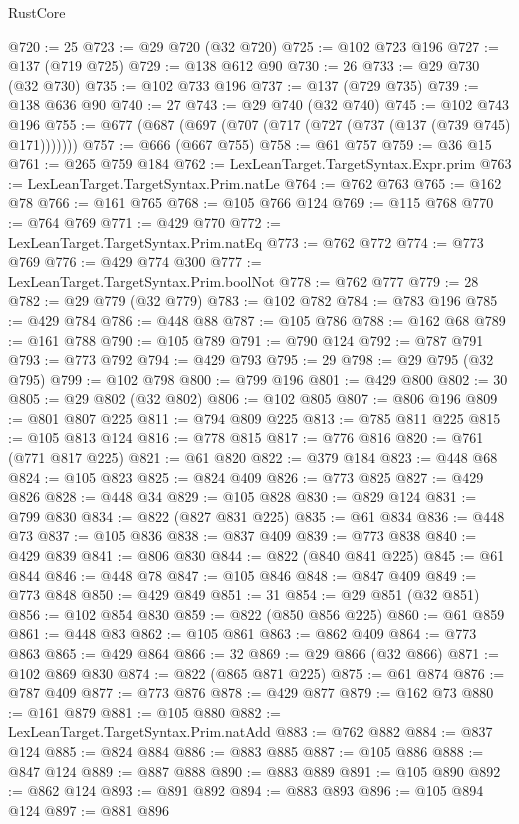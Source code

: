 \begin{lexlean}{RustCore}
\begin{coremodule}
@720 := 25
@723 := @29 @720 (@32 @720)
@725 := @102 @723 @196
@727 := @137 (@719 @725)
@729 := @138 @612 @90
@730 := 26
@733 := @29 @730 (@32 @730)
@735 := @102 @733 @196
@737 := @137 (@729 @735)
@739 := @138 @636 @90
@740 := 27
@743 := @29 @740 (@32 @740)
@745 := @102 @743 @196
@755 := @677 (@687 (@697 (@707 (@717 (@727 (@737 (@137 (@739 @745) @171)))))))
@757 := @666 (@667 @755)
@758 := @61 @757
@759 := @36 @15
@761 := @265 @759 @184
@762 := LexLeanTarget.TargetSyntax.Expr.prim
@763 := LexLeanTarget.TargetSyntax.Prim.natLe
@764 := @762 @763
@765 := @162 @78
@766 := @161 @765
@768 := @105 @766 @124
@769 := @115 @768
@770 := @764 @769
@771 := @429 @770
@772 := LexLeanTarget.TargetSyntax.Prim.natEq
@773 := @762 @772
@774 := @773 @769
@776 := @429 @774 @300
@777 := LexLeanTarget.TargetSyntax.Prim.boolNot
@778 := @762 @777
@779 := 28
@782 := @29 @779 (@32 @779)
@783 := @102 @782
@784 := @783 @196
@785 := @429 @784
@786 := @448 @88
@787 := @105 @786
@788 := @162 @68
@789 := @161 @788
@790 := @105 @789
@791 := @790 @124
@792 := @787 @791
@793 := @773 @792
@794 := @429 @793
@795 := 29
@798 := @29 @795 (@32 @795)
@799 := @102 @798
@800 := @799 @196
@801 := @429 @800
@802 := 30
@805 := @29 @802 (@32 @802)
@806 := @102 @805
@807 := @806 @196
@809 := @801 @807 @225
@811 := @794 @809 @225
@813 := @785 @811 @225
@815 := @105 @813 @124
@816 := @778 @815
@817 := @776 @816
@820 := @761 (@771 @817 @225)
@821 := @61 @820
@822 := @379 @184
@823 := @448 @68
@824 := @105 @823
@825 := @824 @409
@826 := @773 @825
@827 := @429 @826
@828 := @448 @34
@829 := @105 @828
@830 := @829 @124
@831 := @799 @830
@834 := @822 (@827 @831 @225)
@835 := @61 @834
@836 := @448 @73
@837 := @105 @836
@838 := @837 @409
@839 := @773 @838
@840 := @429 @839
@841 := @806 @830
@844 := @822 (@840 @841 @225)
@845 := @61 @844
@846 := @448 @78
@847 := @105 @846
@848 := @847 @409
@849 := @773 @848
@850 := @429 @849
@851 := 31
@854 := @29 @851 (@32 @851)
@856 := @102 @854 @830
@859 := @822 (@850 @856 @225)
@860 := @61 @859
@861 := @448 @83
@862 := @105 @861
@863 := @862 @409
@864 := @773 @863
@865 := @429 @864
@866 := 32
@869 := @29 @866 (@32 @866)
@871 := @102 @869 @830
@874 := @822 (@865 @871 @225)
@875 := @61 @874
@876 := @787 @409
@877 := @773 @876
@878 := @429 @877
@879 := @162 @73
@880 := @161 @879
@881 := @105 @880
@882 := LexLeanTarget.TargetSyntax.Prim.natAdd
@883 := @762 @882
@884 := @837 @124
@885 := @824 @884
@886 := @883 @885
@887 := @105 @886
@888 := @847 @124
@889 := @887 @888
@890 := @883 @889
@891 := @105 @890
@892 := @862 @124
@893 := @891 @892
@894 := @883 @893
@896 := @105 @894 @124
@897 := @881 @896

\end{coremodule}
\end{lexlean}
